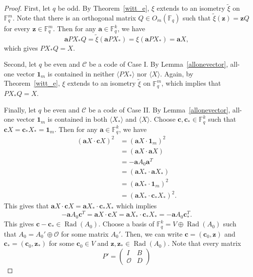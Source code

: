 \documentclass{article}
\theoremstyle{definition}
\theoremstyle{remark}
\begin{document}
\begin{proof}
    First, let $q$ be odd. By Theorem~\ref{witt_e}, $\xi$ extends to an isometry $\tilde{\xi}$ on $\mathbb{F}_q^m$. Note that there is an orthogonal matrix $Q\in O_m(\mathbb{F}_q)$ such that $\tilde{\xi}(\mathbf{z})=\mathbf{z}Q$ for every $\mathbf{z}\in\mathbb{F}_q^m$. Then for any $\mathbf{a}\in\mathbb{F}_q^k$, we have
    \[
    \mathbf{a}PX_*Q=\tilde{\xi}(\mathbf{a}PX_*)=\xi(\mathbf{a}PX_*)=\mathbf{a}X,
    \]
    which gives $PX_*Q=X$.

    Second, let $q$ be even and $\mathcal{C}$ be a code of Case I. By Lemma~\ref{allonevector}, all-one vector $\mathbf{1}_m$ is contained in neither $\langle PX_*\rangle$ nor $\langle X\rangle$. Again, by Theorem~\ref{witt_e}, $\xi$ extends to an isometry $\tilde{\xi}$ on $\mathbb{F}_q^m$, which implies that $PX_*Q=X$.

    Finally, let $q$ be even and $\mathcal{C}$ be a code of Case II. By Lemma~\ref{allonevector}, all-one vector $\mathbf{1}_m$ is contained in both $\langle X_*\rangle$ and $\langle X\rangle$. Choose $\mathbf{c}, \mathbf{c}_*\in \mathbb{F}_q^k$ such that $\mathbf{c}X=\mathbf{c}_*X_*=\mathbf{1}_m$. Then for any $\mathbf{a}\in\mathbb{F}_q^k$, we have
    \begin{align*}
    (\mathbf{a}X\cdot \mathbf{c}X)^2&=
    (\mathbf{a}X\cdot \mathbf{1}_m)^2\\&=
    (\mathbf{a}X\cdot\mathbf{a}X)\\&=
    -\mathbf{a}A_0\mathbf{a}^T\\&=(\mathbf{a}X_*\cdot\mathbf{a}X_*)\\&=
    (\mathbf{a}X_*\cdot \mathbf{1}_m)^2\\&=
    (\mathbf{a}X_*\cdot \mathbf{c}_*X_*)^2.
    \end{align*}
    This gives that $\mathbf{a}X\cdot \mathbf{c}X=\mathbf{a}X_*\cdot \mathbf{c}_*X_*$ which implies
    \[
    -\mathbf{a}A_0\mathbf{c}^T=
    \mathbf{a}X\cdot \mathbf{c}X=
    \mathbf{a}X_*\cdot \mathbf{c}_*X_*=
    -\mathbf{a}A_0\mathbf{c}_*^T.
    \]
    This gives $\mathbf{c}-\mathbf{c}_*\in \operatorname{Rad}(A_0)$. Choose a basis of $\mathbb{F}_q^k=V\oplus\operatorname{Rad}(A_0)$ such that $A_0=A_0'\oplus \mathcal{O}$ for some matrix $A_0'$. Then, we can write $\mathbf{c}=(\mathbf{c}_0, \mathbf{z})$ and $\mathbf{c}_*=(\mathbf{c}_0, \mathbf{z}_*)$ for some $\mathbf{c}_0\in V$ and $\mathbf{z}, \mathbf{z}_*\in \operatorname{Rad}(A_0)$. Note that every matrix
    \[
    P'=\begin{pmatrix}
        I & B\\\mathcal{O} & D

\end{pmatrix}\]
\end{proof}
\end{document}
